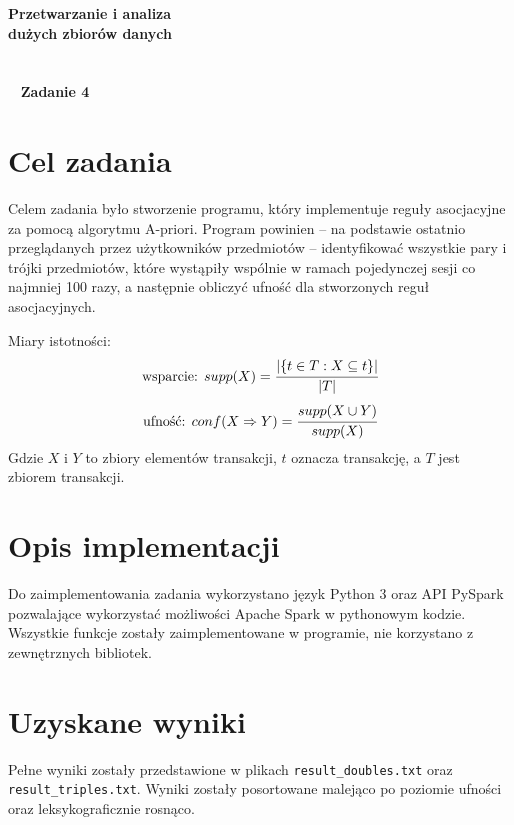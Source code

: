 \documentclass[a4paper,11pt]{article}
\begin{document}
\begin{titlepage}
\begin{center}
\textbf{\Huge{Przetwarzanie i analiza\\}}
\textbf{\Huge{dużych zbiorów danych\\~\\~\\~}}
\textbf{\Huge{Zadanie 4}}
\end{center}

\end{titlepage}

\setcounter{page}{2}

\newpage
\section{Cel zadania}
    Celem zadania było stworzenie programu, który implementuje reguły asocjacyjne za pomocą algorytmu A-priori. Program powinien -- na podstawie ostatnio przeglądanych przez użytkowników przedmiotów -- identyfikować wszystkie pary i trójki przedmiotów, które wystąpiły wspólnie w ramach pojedynczej sesji co najmniej 100 razy, a następnie obliczyć ufność dla stworzonych reguł asocjacyjnych.
    
    Miary istotności:
    \begin{equation}
        \text{wsparcie: } supp(X) = \cfrac{|\{t \in T: X \subseteq t\}|}{|T|}
    \end{equation}
    \begin{equation}
        \text{ufność: } conf(X \Rightarrow Y) = \cfrac{supp(X \cup Y)}{supp(X)}
    \end{equation}
    Gdzie $X$ i $Y$ to zbiory elementów transakcji, $t$ oznacza transakcję, a $T$ jest zbiorem transakcji.

\section{Opis implementacji}
    Do zaimplementowania zadania wykorzystano język Python 3 oraz API PySpark pozwalające wykorzystać możliwości Apache Spark w pythonowym kodzie. Wszystkie funkcje zostały zaimplementowane w programie, nie korzystano z zewnętrznych bibliotek.

\section{Uzyskane wyniki}
    Pełne wyniki zostały przedstawione w plikach \texttt{result\_doubles.txt} oraz \texttt{result\_triples.txt}. Wyniki zostały posortowane malejąco po poziomie ufności oraz leksykograficznie rosnąco.
    
\end{document}
